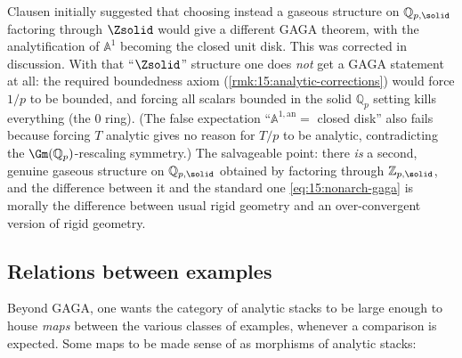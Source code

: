 \begin{remark}
\label{rmk:15:qp-overconvergent}
Clausen initially suggested that choosing instead a gaseous structure on
$\mathbb{Q}_{p,\solid}$ factoring through $\Zsolid$ would give a different GAGA
theorem, with the analytification of $\mathbb{A}^1$ becoming the closed unit disk.
This was corrected in discussion. With that ``$\Zsolid$'' structure one does \emph{not}
get a GAGA statement at all: the required boundedness axiom
(\cref{rmk:15:analytic-corrections}) would force $1/p$ to be bounded, and forcing all
scalars bounded in the solid $\mathbb{Q}_p$ setting kills everything (the $0$ ring).
(The false expectation ``$\mathbb{A}^{1,\mathrm{an}} = $ closed disk'' also fails
because forcing $T$ analytic gives no reason for $T/p$ to be analytic, contradicting
the $\Gm(\mathbb{Q}_p)$-rescaling symmetry.) The salvageable point: there \emph{is} a
second, genuine gaseous structure on $\mathbb{Q}_{p,\solid}$ obtained by factoring
through $\mathbb{Z}_{p,\solid}$, and the difference between it and the standard one
\eqref{eq:15:nonarch-gaga} is morally the difference between usual rigid geometry and
an over-convergent version of rigid geometry.
\end{remark}

\subsection{Relations between examples}

Beyond GAGA, one wants the category of analytic stacks to be large enough to house
\emph{maps} between the various classes of examples, whenever a comparison is
expected. Some maps to be made sense of as morphisms of analytic stacks:

